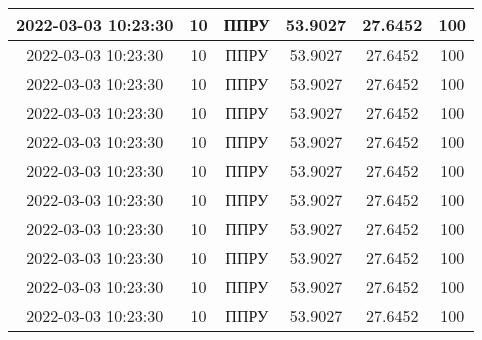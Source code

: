 ﻿\documentclass[a4paper]{article}
\begin{document}
\begin{center}
\begin{longtable}{|c|c|c|c|c|c|}
            2022-03-03 10:23:30 & 10 & ППРУ & 53.9027 & 27.6452 & 100 \\ \hline
            2022-03-03 10:23:30 & 10 & ППРУ & 53.9027 & 27.6452 & 100 \\ \hline
            2022-03-03 10:23:30 & 10 & ППРУ & 53.9027 & 27.6452 & 100 \\ \hline
            2022-03-03 10:23:30 & 10 & ППРУ & 53.9027 & 27.6452 & 100 \\ \hline
            2022-03-03 10:23:30 & 10 & ППРУ & 53.9027 & 27.6452 & 100 \\ \hline
            2022-03-03 10:23:30 & 10 & ППРУ & 53.9027 & 27.6452 & 100 \\ \hline
            2022-03-03 10:23:30 & 10 & ППРУ & 53.9027 & 27.6452 & 100 \\ \hline
            2022-03-03 10:23:30 & 10 & ППРУ & 53.9027 & 27.6452 & 100 \\ \hline
            2022-03-03 10:23:30 & 10 & ППРУ & 53.9027 & 27.6452 & 100 \\ \hline
            2022-03-03 10:23:30 & 10 & ППРУ & 53.9027 & 27.6452 & 100 \\ \hline
            2022-03-03 10:23:30 & 10 & ППРУ & 53.9027 & 27.6452 & 100 \\ \hline
        \end{longtable}
    \end{center}
\end{document}
